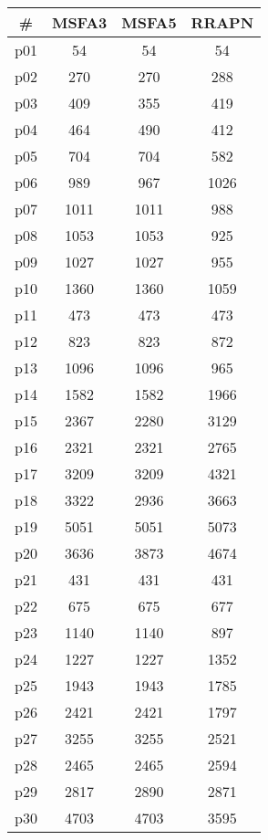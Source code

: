 \begin{tabular}{cccc}
\toprule
\textbf{\#} & \textbf{MSFA3} & \textbf{MSFA5} & \textbf{RRAPN}\\
\midrule
p01 & 54 & 54 & 54\\
p02 & 270 & 270 & 288\\
p03 & 409 & 355 & 419\\
p04 & 464 & 490 & 412\\
p05 & 704 & 704 & 582\\
p06 & 989 & 967 & 1026\\
p07 & 1011 & 1011 & 988\\
p08 & 1053 & 1053 & 925\\
p09 & 1027 & 1027 & 955\\
p10 & 1360 & 1360 & 1059\\
p11 & 473 & 473 & 473\\
p12 & 823 & 823 & 872\\
p13 & 1096 & 1096 & 965\\
p14 & 1582 & 1582 & 1966\\
p15 & 2367 & 2280 & 3129\\
p16 & 2321 & 2321 & 2765\\
p17 & 3209 & 3209 & 4321\\
p18 & 3322 & 2936 & 3663\\
p19 & 5051 & 5051 & 5073\\
p20 & 3636 & 3873 & 4674\\
p21 & 431 & 431 & 431\\
p22 & 675 & 675 & 677\\
p23 & 1140 & 1140 & 897\\
p24 & 1227 & 1227 & 1352\\
p25 & 1943 & 1943 & 1785\\
p26 & 2421 & 2421 & 1797\\
p27 & 3255 & 3255 & 2521\\
p28 & 2465 & 2465 & 2594\\
p29 & 2817 & 2890 & 2871\\
p30 & 4703 & 4703 & 3595\\
\bottomrule
\end{tabular}

